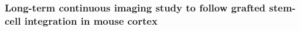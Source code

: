 \subsubsection{Long-term continuous imaging study to follow grafted stem-cell integration in
mouse cortex}